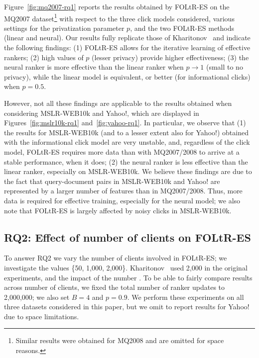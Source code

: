 Figure~\ref{fig:mq2007-rq1} reports the results obtained by FOLtR-ES on the MQ2007 dataset\footnote{Similar results were obtained for MQ2008 and are omitted for space reasons.} with respect to the three click models considered, various settings for the privatization parameter $p$, and the two FOLtR-ES methods (linear and neural). Our results fully replicate those of Kharitonov~\cite{kharitonov2019federated} and indicate the following findings: (1) FOLtR-ES allows for the iterative learning of effective rankers; (2) high values of $p$ (lesser privacy) provide higher effectiveness; 
(3) the neural ranker is more effective than the linear ranker when $p \rightarrow 1$ (small to no privacy), while the linear model is equivalent, or better (for informational clicks) when $p=0.5$. 

However, not all these findings are applicable to the results obtained when considering MSLR-WEB10k and Yahoo!, which are displayed in Figures~\ref{fig:mslr10k-rq1} and~\ref{fig:yahoo-rq1}. In particular, we observe that (1) the results for MSLR-WEB10k (and to a lesser extent also for Yahoo!) obtained with the informational click model are very unstable, and, regardless of the click model, FOLtR-ES requires more data than with MQ2007/2008 to arrive at a stable performance, when it does; (2) the neural ranker is less effective than the linear ranker, especially on MSLR-WEB10k. We believe these findings are due to the fact that query-document pairs in MSLR-WEB10k and Yahoo! are represented by a larger number of features than in MQ2007/2008. Thus, more data is required for effective training, especially for the neural model; we also note that FOLtR-ES is largely affected by noisy clicks in MSLR-WEB10k. 

\subsection{RQ2: Effect of number of clients on FOLtR-ES}
To answer RQ2 we vary the number of clients involved in FOLtR-ES; we investigate the values \{50, 1,000, 2,000\}. Kharitonov~\cite{kharitonov2019federated} used 2,000 in the original experiments, and the impact of the number {\color{red}{has not been studied}}. To be able to fairly compare results across number of clients, we fixed the total number of ranker updates to 2,000,000; we also set $B = 4$ and $p=0.9$. We perform these experiments on all three datasets considered in this paper, but we omit to report results for Yahoo! due to space limitations. 

